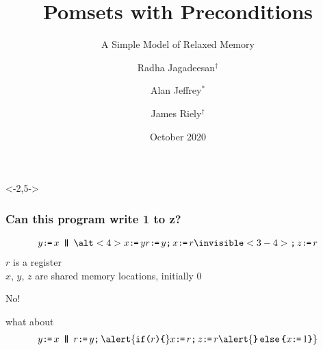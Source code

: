 \documentclass[t,aspectratio=169]{beamer} %
\title{Pomsets with Preconditions}
\subtitle{A Simple Model of Relaxed Memory}
\author{Radha Jagadeesan$^\dagger$ \and Alan Jeffrey$^*$ \and James Riely$^\dagger$}
\date{October 2020}
\institute{$^\dagger$DePaul University \and $^*$Mozilla Research and the Servo Project}
\begin{document}
\begin{frame}
  \maketitle
\end{frame}

\begin{frame}<-2,5->
  \frametitle{Can this program write 1 to z?}
  \begin{gather*}
    y\GETS x
    \PAR
    \alt<4>{x\GETS y}{r\GETS y \SEMI x\GETS r}
    \invisible<3-4>{\SEMI z\GETS r}
  \end{gather*}
  $r$ is a register\\
  $x$, $y$, $z$ are shared memory locations, initially $0$

  \bigskip \bigskip
  No!
  
  \bigskip \bigskip
  what about
  \begin{gather*}
    y\GETS x
    \PAR
    r\GETS y\SEMI
    \alert{\IF{r}\THEN} x\GETS r\SEMI z\GETS r \alert{\ELSE x\GETS1 \FI}
  \end{gather*}
\end{frame}
\end{document}
